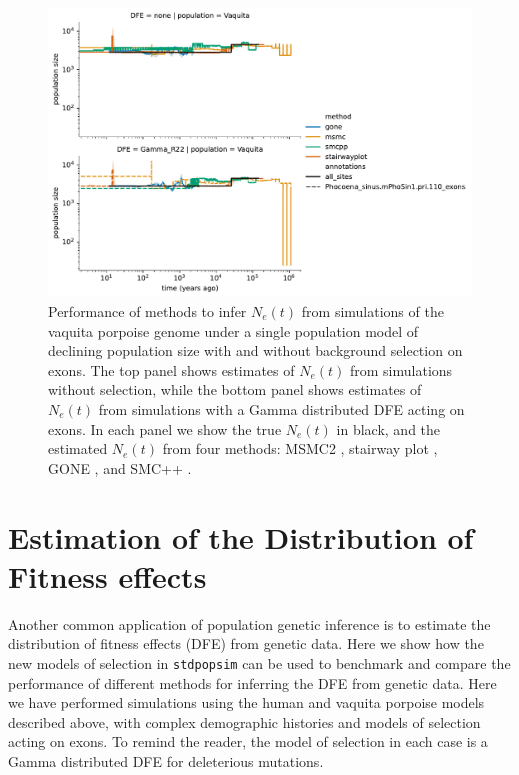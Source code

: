 \documentclass[hidelinks]{article}
\newcommand{\stdpopsim}{\texttt{stdpopsim}\xspace}
\begin{document}
\begin{figure}[t]
    \centering
    \includegraphics[width=\textwidth]{figures/PhoSin/Vaquita2Epoch_1R22/estimated_Ne_t_final}
    \caption{
    \label{fig:1pop-vaquita-demography}
    Performance of methods to infer $N_e(t)$ from simulations of the vaquita porpoise genome under a single population
    model of declining population size \citep{robinson2022critically} with and without background selection on exons. 
    The top panel shows estimates of $N_e(t)$ from simulations
    without selection, while the bottom panel shows estimates of $N_e(t)$ from simulations with a Gamma distributed   
    DFE acting on exons. In each panel we show the true $N_e(t)$ in black, and the estimated $N_e(t)$ from four methods:    
    MSMC2 \citep{Schiffels2020}, stairway plot \citep{liu2020stairway}, GONE \citep{santiago2020recent}, and SMC++ \citep{terhorst2017robust}.  
    }
\end{figure}

\section*{Estimation of the Distribution of Fitness effects}
    \label{dfe}
    Another common application of population genetic inference is to estimate the distribution of fitness effects (DFE)
    from genetic data. Here we show how the new models of selection in \stdpopsim can be used to benchmark and compare
    the performance of different methods for inferring the DFE from genetic data. Here we have performed simulations using the 
    human and vaquita porpoise models described above, with complex demographic histories and models of selection acting on exons.
    To remind the reader, the model of selection in each case is a Gamma distributed DFE for deleterious mutations.
\end{document}
